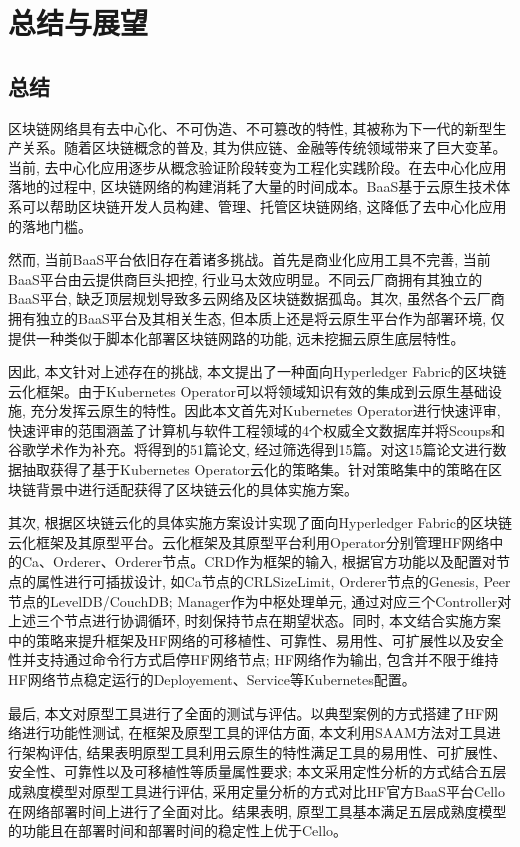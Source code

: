 \chapter{总结与展望}

\section{总结}

区块链网络具有去中心化、不可伪造、不可篡改的特性, 其被称为下一代的新型生产关系。随着区块链概念的普及, 其为供应链、金融等传统领域带来了巨大变革。当前, 去中心化应用逐步从概念验证阶段转变为工程化实践阶段。在去中心化应用落地的过程中, 区块链网络的构建消耗了大量的时间成本。BaaS基于云原生技术体系可以帮助区块链开发人员构建、管理、托管区块链网络, 这降低了去中心化应用的落地门槛。

然而, 当前BaaS平台依旧存在着诸多挑战。首先是商业化应用工具不完善, 当前BaaS平台由云提供商巨头把控, 行业马太效应明显。不同云厂商拥有其独立的BaaS平台, 缺乏顶层规划导致多云网络及区块链数据孤岛。其次, 虽然各个云厂商拥有独立的BaaS平台及其相关生态, 但本质上还是将云原生平台作为部署环境, 仅提供一种类似于脚本化部署区块链网路的功能, 远未挖掘云原生底层特性。

因此, 本文针对上述存在的挑战, 本文提出了一种面向Hyperledger Fabric的区块链云化框架。由于Kubernetes Operator可以将领域知识有效的集成到云原生基础设施, 充分发挥云原生的特性。因此本文首先对Kubernetes Operator进行快速评审, 快速评审的范围涵盖了计算机与软件工程领域的4个权威全文数据库并将Scoups和谷歌学术作为补充。将得到的51篇论文, 经过筛选得到15篇。对这15篇论文进行数据抽取获得了基于Kubernetes Operator云化的策略集。针对策略集中的策略在区块链背景中进行适配获得了区块链云化的具体实施方案。

其次, 根据区块链云化的具体实施方案设计实现了面向Hyperledger Fabric的区块链云化框架及其原型平台。云化框架及其原型平台利用Operator分别管理HF网络中的Ca、Orderer、Orderer节点。CRD作为框架的输入, 根据官方功能以及配置对节点的属性进行可插拔设计, 如Ca节点的CRLSizeLimit, Orderer节点的Genesis, Peer节点的LevelDB/CouchDB; Manager作为中枢处理单元, 通过对应三个Controller对上述三个节点进行协调循环, 时刻保持节点在期望状态。同时, 本文结合实施方案中的策略来提升框架及HF网络的可移植性、可靠性、易用性、可扩展性以及安全性并支持通过命令行方式启停HF网络节点; HF网络作为输出, 包含并不限于维持HF网络节点稳定运行的Deployement、Service等Kubernetes配置。

最后, 本文对原型工具进行了全面的测试与评估。以典型案例的方式搭建了HF网络进行功能性测试, 在框架及原型工具的评估方面, 本文利用SAAM方法对工具进行架构评估, 结果表明原型工具利用云原生的特性满足工具的易用性、可扩展性、安全性、可靠性以及可移植性等质量属性要求; 本文采用定性分析的方式结合五层成熟度模型对原型工具进行评估, 采用定量分析的方式对比HF官方BaaS平台Cello在网络部署时间上进行了全面对比。结果表明, 原型工具基本满足五层成熟度模型的功能且在部署时间和部署时间的稳定性上优于Cello。

